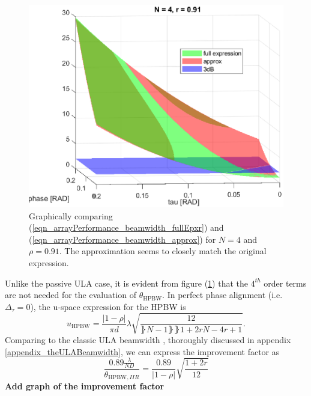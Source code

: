     \begin{figure}
        \label{fig_singleFreqFeedback_2ndTaylorNumericalValidation}
        \centering
        \includegraphics[width=0.9\linewidth]{./Media/spatial_IIR_MATLAB/beamwidth/BW_approx_validation.eps}
        \caption{Graphically comparing (\ref{eqn_arrayPerformance_beamwidth_fullEpxr}) and (\ref{eqn_arrayPerformance_beamwidth_approx}) for $N=4$ and $\rho=0.91$. The approximation seems to closely match the original expression.}
    \end{figure}
    Unlike the passive ULA case, it is evident from figure (\ref{fig_singleFreqFeedback_2ndTaylorNumericalValidation}) that the $4^{th}$ order terms are not needed for the evaluation of $\theta_{\text{HPBW}}$. In perfect phase alignment (i.e. $\Delta_{\tau}=0$), the u-space expression for the HPBW is $$u_{\text{HPBW}} =
    \frac{
    \left|1-\rho\right|
    }{
    \pi{d}
    }
    \lambda
    \sqrt{\frac{
    12
    }{
    \rBrace{N-1}\rBrace{\rBrace{1+2r}N-4r+1}
    }}.
    $$
    Comparing to the classic ULA beamwidth \cite{VanTrees2002DetectionIV}, thoroughly discussed in appendix \ref{appendix_theULABeamwidth}, we can express the improvement factor as
    $$
    \frac{
    0.89\frac{\lambda}{ND}
    }{
    \theta_{\text{HPBW},IIR}
    }
    =
    \frac{0.89}{\left|1-\rho\right|}\sqrt{\frac{1+2r}{12}}
    $$
    \textbf{Add graph of the improvement factor}
\fi
